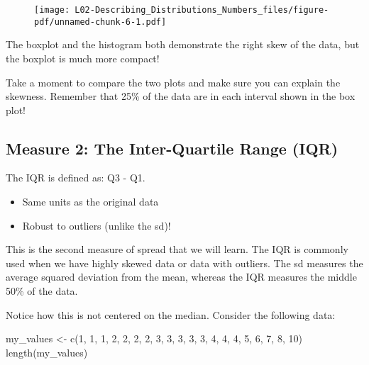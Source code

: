 \documentclass[
  letterpaper,
  DIV=11,
  numbers=noendperiod]{scrreprt}
\newenvironment{Shaded}{\begin{snugshade}}{\end{snugshade}}
\newcommand{\DecValTok}[1]{\textcolor[rgb]{0.68,0.00,0.00}{#1}}
\newcommand{\FunctionTok}[1]{\textcolor[rgb]{0.28,0.35,0.67}{#1}}
\newcommand{\NormalTok}[1]{\textcolor[rgb]{0.00,0.23,0.31}{#1}}
\newcommand{\OtherTok}[1]{\textcolor[rgb]{0.00,0.23,0.31}{#1}}
\providecommand{\tightlist}{%
  \setlength{\itemsep}{0pt}\setlength{\parskip}{0pt}}\usepackage{longtable,booktabs,array}
\begin{document}
\begin{figure}[H]

{\centering \texttt{[image: L02-Describing\_Distributions\_Numbers\_files/figure-pdf/unnamed-chunk-6-1.pdf]}

}

\end{figure}

The boxplot and the histogram both demonstrate the right skew of the
data, but the boxplot is much more compact!

Take a moment to compare the two plots and make sure you can explain the
skewness. Remember that 25\% of the data are in each interval shown in
the box plot!

\hypertarget{measure-2-the-inter-quartile-range-iqr}{%
\subsection{Measure 2: The Inter-Quartile Range
(IQR)}\label{measure-2-the-inter-quartile-range-iqr}}

The IQR is defined as: Q3 - Q1.

\begin{itemize}
\tightlist
\item
  Same units as the original data
\item
  Robust to outliers (unlike the sd)!
\end{itemize}

This is the second measure of spread that we will learn. The IQR is
commonly used when we have highly skewed data or data with outliers. The
sd measures the average squared deviation from the mean, whereas the IQR
measures the middle 50\% of the data.

Notice how this is not centered on the median. Consider the following
data:

\begin{Shaded}
\begin{Highlighting}[]
\NormalTok{my\_values }\OtherTok{\textless{}{-}} \FunctionTok{c}\NormalTok{(}\DecValTok{1}\NormalTok{, }\DecValTok{1}\NormalTok{, }\DecValTok{1}\NormalTok{, }\DecValTok{2}\NormalTok{, }\DecValTok{2}\NormalTok{, }\DecValTok{2}\NormalTok{, }\DecValTok{2}\NormalTok{, }\DecValTok{3}\NormalTok{, }\DecValTok{3}\NormalTok{, }\DecValTok{3}\NormalTok{, }\DecValTok{3}\NormalTok{, }\DecValTok{3}\NormalTok{, }\DecValTok{4}\NormalTok{, }\DecValTok{4}\NormalTok{, }\DecValTok{4}\NormalTok{, }\DecValTok{5}\NormalTok{, }\DecValTok{6}\NormalTok{, }\DecValTok{7}\NormalTok{, }\DecValTok{8}\NormalTok{, }\DecValTok{10}\NormalTok{)}
\FunctionTok{length}\NormalTok{(my\_values)}
\end{Highlighting}
\end{Shaded}
\end{document}
